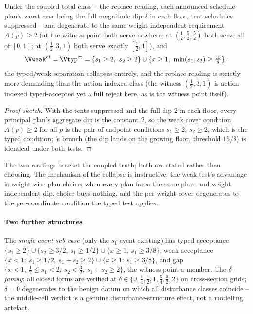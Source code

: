 \begin{theorem}\label{thm:replace}
Under the coupled-total class -- the replace reading, each announced-schedule plan's worst case being the full-magnitude dip $2$ in each floor, tent schedules suppressed --  and  degenerate to the same weight-independent requirement $A(p)\ge2$ (at the witness point both serve nowhere; at $(\tfrac12,\tfrac52,\tfrac52)$ both serve all of $[0,1]$; at $(\tfrac12,3,1)$ both serve exactly $[\tfrac12,1]$), and
\[
\Vweak^{\mathrm{ct}}=\Vtyp^{\mathrm{ct}}=\{s_1\ge2,\ s_2\ge2\}\cup\{x\ge1,\ \min(s_1,s_2)\ge\tfrac{15}8\}:
\]
the typed/weak separation collapses entirely, and the replace reading is strictly more demanding than the action-indexed class (the witness $(\tfrac12,3,1)$ is action-indexed typed-accepted yet a full reject here, as is the witness point itself).
\end{theorem}
\begin{proof}[Proof sketch]
With the tents suppressed and the full dip $2$ in each floor, every principal plan's aggregate dip is the constant $2$, so the weak cover condition $A(p)\ge2$ for all $p$ is the pair of endpoint conditions $s_1\ge2$, $s_2\ge2$, which is the typed condition; 's branch (the dip lands on the growing floor, threshold $15/8$) is identical under both tests.
\end{proof}

The two readings bracket the coupled truth; both are stated rather than choosing. The mechanism of the collapse is instructive: the weak test's advantage is weight-wise plan choice; when every plan faces the same plan- and weight-independent dip, choice buys nothing, and the per-weight cover degenerates to the per-coordinate condition the typed test applies.

\paragraph{Two further structures} The \emph{single-event sub-case} (only the $s_1$-event existing) has typed acceptance $\{s_1\ge2\}\cup\{s_2\ge3/2,\ s_1\ge1/2\}\cup\{x\ge1,\ s_1\ge3/8\}$, weak acceptance $\{x<1:\ s_1\ge1/2,\ s_1+s_2\ge2\}\cup\{x\ge1:\ s_1\ge3/8\}$, and gap $\{x<1,\ \tfrac12\le s_1<2,\ s_2<\tfrac32,\ s_1+s_2\ge2\}$, the witness point a member. The \emph{$\delta$-family}: all closed forms are verified at $\delta\in\{0,\tfrac14,\tfrac12,1,\tfrac54,\tfrac32,2\}$ on cross-section grids; $\delta=0$ degenerates to the benign datum on which all disturbance classes coincide -- the middle-cell verdict is a genuine disturbance-structure effect, not a modelling artefact.

